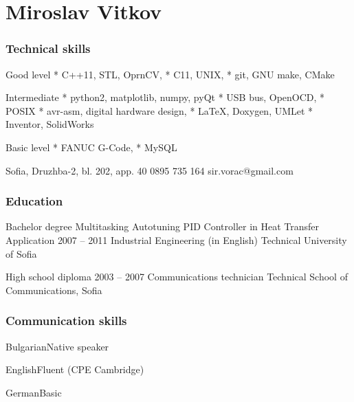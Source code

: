 \documentclass{tccv}
\begin{document}
\part{Miroslav Vitkov}


\section{Technical skills}
\begin{factlist}
\item{Good level}
{
     * C++11, STL, OprnCV,               \mynext
     * C11, UNIX,                        \mynext
     * git, GNU make, CMake
}

\item{Intermediate}
{
    * python2, matplotlib, numpy, pyQt   \mynext
    * USB bus, OpenOCD,                  \mynext
    * POSIX                              \mynext
    * avr-asm, digital hardware design,  \mynext
    * LaTeX, Doxygen, UMLet              \mynext
    * Inventor, SolidWorks
}

\item{Basic level}
{
    * FANUC G-Code,                      \mynext
    * MySQL
}
\end{factlist}


\personal
    {Sofia, Druzhba-2, bl. 202, app. 40}
    {0895 735 164}
    {sir.vorac@gmail.com}


\section{Education}
\begin{yearlist}
\item[Bachelor degree                  \newline
      {\footnotesize Multitasking Autotuning PID Controller in Heat Transfer Application}]
     {2007 -- 2011}
     {Industrial Engineering (in English)}
     {Technical University of Sofia}

\item[High school diploma]{2003 -- 2007}
     {Communications technician}
     {Technical School of Communications, Sofia}
\end{yearlist}


\section{Communication skills}
\begin{factlist}
\item{Bulgarian}{Native speaker}
\item{English}{Fluent (CPE Cambridge)}
\item{German}{Basic}
\end{factlist}
\end{document}

